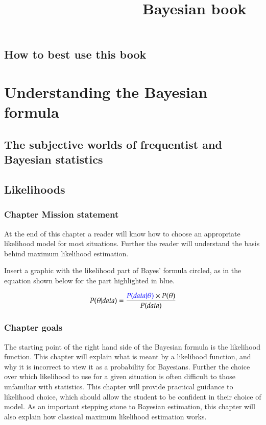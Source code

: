 \documentclass[11pt,fullpage]{book}
\title{\textbf{~~~~~~~~~~~~~~~}\newline Bayesian book}
\author{}
\begin{document}
\tableofcontents
\chapter{How to best use this book}
\part{Understanding the Bayesian formula}
\chapter{The subjective worlds of frequentist and Bayesian statistics}

\chapter{Likelihoods}\label{chap:Likelihoods}
\section{Chapter Mission statement}
At the end of this chapter a reader will know how to choose an appropriate likelihood model for most situations. Further the reader will understand the basis behind maximum likelihood estimation.

Insert a graphic with the likelihood part of Bayes' formula circled, as in the equation shown below for the part highlighted in blue.

\begin{equation}
P(\theta|data) = \frac{{\color{blue}P(data|\theta)}\times P(\theta)}{P(data)}
\end{equation}\label{eq:Likelihood_BayesHighlighted}

\section{Chapter goals}
The starting point of the right hand side of the Bayesian formula is the likelihood function. This chapter will explain what is meant by a likelihood function, and why it is incorrect to view it as a probability for Bayesians. Further the choice over which likelihood to use for a given situation is often difficult to those unfamiliar with statistics. This chapter will provide practical guidance to likelihood choice, which should allow the student to be confident in their choice of model. As an important stepping stone to Bayesian estimation, this chapter will also explain how classical maximum likelihood estimation works. 
\end{document}
